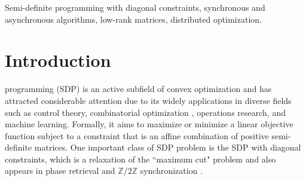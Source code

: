 \documentclass[journal]{IEEEtran}
\begin{document}
\begin{IEEEkeywords}
 Semi-definite programming with diagonal constraints, synchronous and asynchronous algorithms, low-rank matrices, distributed optimization.
\end{IEEEkeywords}






%
\IEEEpeerreviewmaketitle



\section{Introduction}
%
%
%
%
 programming (SDP) is an active subfield of convex optimization and has attracted considerable attention due to its widely applications in diverse fields such as control theory\cite{smart_admm,semi_observer,2003Semidefinite}, combinatorial optimization \cite{center_sdp,combina}, operations research\cite{max_like,eco_dispatch}, and machine learning\cite{matrix_learning,kernel_matrixlearning,distance_matrix}. Formally, it aims to maximize or minimize a linear objective function subject to a constraint that is an affine combination of positive semi-definite matrices. One important class of SDP problem is the  SDP with diagonal constraints, which is a relaxation of the ``maximum cut" problem \cite{1995Improved} and also appears in phase retrieval \cite{Waldspurger2012Phase} and $\mathbb Z/2\mathbb Z$ synchronization \cite{2014Exact}. 
\end{document}
